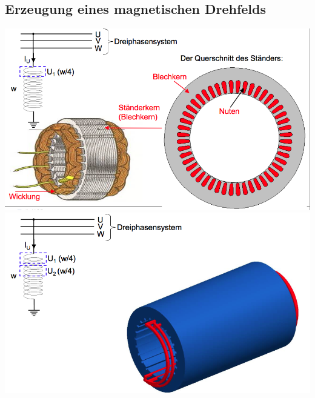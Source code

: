 \subsection{Erzeugung eines magnetischen Drehfelds}
\begin{minipage}{0.5 \linewidth}
\includegraphics[width = \linewidth]{./Pics/VL89/Drehfeld}
\includegraphics[width = \linewidth]{./Pics/VL89/Drehfeld3}
\end{minipage}
